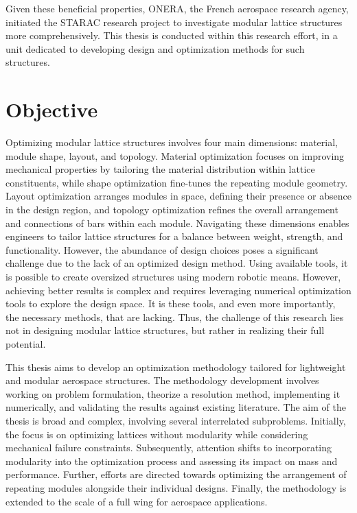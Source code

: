 Given these beneficial properties, ONERA, the French aerospace research agency, initiated the STARAC research project to investigate modular lattice structures more comprehensively. This thesis is conducted within this research effort, in a unit dedicated to developing design and optimization methods for such structures.

\section*{Objective}
Optimizing modular lattice structures involves four main dimensions: material, module shape, layout, and topology. Material optimization focuses on improving mechanical properties by tailoring the material distribution within lattice constituents, while shape optimization fine-tunes the repeating module geometry. Layout optimization arranges modules in space, defining their presence or absence in the design region, and topology optimization refines the overall arrangement and connections of bars within each module. Navigating these dimensions enables engineers to tailor lattice structures for a balance between weight, strength, and functionality. However, the abundance of design choices poses a significant challenge due to the lack of an optimized design method. Using available tools, it is possible to create oversized structures using modern robotic means. However, achieving better results is complex and requires leveraging numerical optimization tools to explore the design space. It is these tools, and even more importantly, the necessary methods, that are lacking. Thus, the challenge of this research lies not in designing modular lattice structures, but rather in realizing their full potential.

This thesis aims to develop an optimization methodology tailored for lightweight and modular aerospace structures. The methodology development involves working on problem formulation, theorize a resolution method, implementing it numerically, and validating the results against existing literature. The aim of the thesis is broad and complex, involving several interrelated subproblems. Initially, the focus is on optimizing lattices without modularity while considering mechanical failure constraints. Subsequently, attention shifts to incorporating modularity into the optimization process and assessing its impact on mass and performance. Further, efforts are directed towards optimizing the arrangement of repeating modules alongside their individual designs. Finally, the methodology is extended to the scale of a full wing for aerospace applications.


